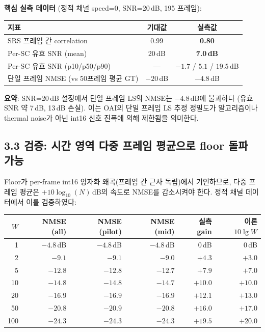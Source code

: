 \documentclass[11pt,a4paper]{article}
\begin{document}
\textbf{핵심 실측 데이터} (정적 채널 speed=0, SNR=20\,dB, 195 프레임):

\begin{table}[h]\centering
\begin{tabular}{lcc}
\toprule
지표 & 기대값 & 실측값 \\
\midrule
SRS 프레임 간 correlation & 0.99 & \textbf{0.80} \\
Per-SC 유효 SNR (mean) & 20\,dB & \textbf{7.0\,dB} \\
Per-SC 유효 SNR (p10/p50/p90) & --- & $-1.7$ / $5.1$ / $19.5$\,dB \\
단일 프레임 NMSE (vs 50프레임 평균 GT) & $-20$\,dB & $\mathbf{-4.8}$\,dB \\
\bottomrule
\end{tabular}
\end{table}

\textbf{요약}: SNR=20\,dB 설정에서 단일 프레임 LS의 NMSE는 $-4.8$\,dB에 불과하다 (유효 SNR 약 7\,dB, 13\,dB 손실). 이는 OAI의 단일 프레임 LS 추정 정밀도가 알고리즘이나 thermal noise가 아닌 int16 신호 진폭에 의해 제한됨을 의미한다.

\subsection{3.3 검증: 시간 영역 다중 프레임 평균으로 floor 돌파 가능}

Floor가 per-frame int16 양자화 왜곡(프레임 간 근사 독립)에서 기인하므로, 다중 프레임 평균은 $+10\log_{10}(N)$\,dB의 속도로 NMSE를 감소시켜야 한다. 정적 채널 데이터에서 이를 검증하였다:

\begin{table}[h]\centering
\begin{tabular}{rrrrrr}
\toprule
$W$ & NMSE (all) & NMSE (pilot) & NMSE (mid) & 실측 gain & 이론 $10\lg W$ \\
\midrule
1 & $-4.8$\,dB & $-4.8$\,dB & $-4.8$\,dB & 0\,dB & 0\,dB \\
2 & $-9.1$ & $-9.1$ & $-9.0$ & $+4.3$ & $+3.0$ \\
5 & $-12.8$ & $-12.8$ & $-12.7$ & $+7.9$ & $+7.0$ \\
10 & $-14.8$ & $-14.8$ & $-14.7$ & $+10.0$ & $+10.0$ \\
20 & $-16.9$ & $-16.9$ & $-16.9$ & $+12.1$ & $+13.0$ \\
50 & $-20.8$ & $-20.9$ & $-20.8$ & $+16.0$ & $+17.0$ \\
100 & $-24.3$ & $-24.3$ & $-24.3$ & $+19.5$ & $+20.0$ \\
\bottomrule
\end{tabular}
\end{table}
\end{document}
